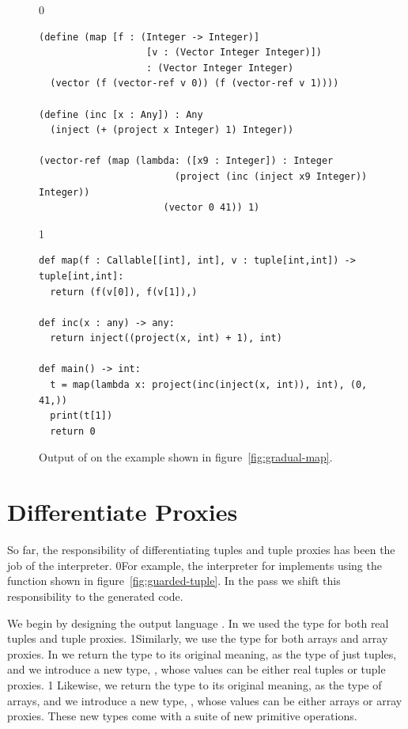 \documentclass[7x10]{TimesAPriori_MIT}%
\def\racketEd{0}
\def\pythonEd{1}
\def\edition{1}
\newcommand{\racket}[1]{{\if\edition\racketEd{#1}\fi}}
\newcommand{\pythonColor}[0]{}
\newcommand{\python}[1]{{\if\edition\pythonEd\pythonColor #1\fi}}
\numberwithin{theorem}{chapter}
\numberwithin{definition}{chapter}
\numberwithin{equation}{chapter}
\begin{document}
\begin{figure}[tbp]
\begin{tcolorbox}[colback=white]  
{\if\edition\racketEd    
\begin{lstlisting}
(define (map [f : (Integer -> Integer)]
                   [v : (Vector Integer Integer)])
                   : (Vector Integer Integer)
  (vector (f (vector-ref v 0)) (f (vector-ref v 1))))

(define (inc [x : Any]) : Any
  (inject (+ (project x Integer) 1) Integer))

(vector-ref (map (lambda: ([x9 : Integer]) : Integer
                        (project (inc (inject x9 Integer)) Integer))
                      (vector 0 41)) 1)
\end{lstlisting}
\fi}
{\if\edition\pythonEd\pythonColor
\begin{lstlisting}[basicstyle=\ttfamily\footnotesize]
def map(f : Callable[[int], int], v : tuple[int,int]) -> tuple[int,int]:
  return (f(v[0]), f(v[1]),)

def inc(x : any) -> any:
  return inject((project(x, int) + 1), int)

def main() -> int:
  t = map(lambda x: project(inc(inject(x, int)), int), (0, 41,))
  print(t[1])
  return 0
\end{lstlisting}
\fi}
\end{tcolorbox}

\caption{Output of  on the example shown in
  figure~\ref{fig:gradual-map}.}
\label{fig:map-lower-cast}
\end{figure}


\section{Differentiate Proxies }
\label{sec:differentiate-proxies}

So far, the responsibility of differentiating tuples and tuple proxies
has been the job of the interpreter.
%
\racket{For example, the interpreter for \LangCast{} implements
  \code{vector-ref} using the \code{guarded-vector-ref} function shown in
  figure~\ref{fig:guarded-tuple}.}
%
In the  pass we shift this responsibility
to the generated code.

We begin by designing the output language \LangPVec{}.  In \LangGrad{}
we used the type \TUPLETYPENAME{} for both
real tuples and tuple proxies.
\python{Similarly, we use the type  for both arrays and
array proxies.}
In \LangPVec{} we return the
\TUPLETYPENAME{} type to its original
meaning, as the type of just tuples, and we introduce a new type,
\PTUPLETYNAME{}, whose values
can be either real tuples or tuple
proxies.
%
{\if\edition\pythonEd\pythonColor
Likewise, we return the
\ARRAYTYPENAME{} type to its original
meaning, as the type of arrays, and we introduce a new type,
\PARRAYTYNAME{}, whose values
can be either arrays or array proxies.
These new types come with a suite of new primitive operations.
\fi}
\end{document}
